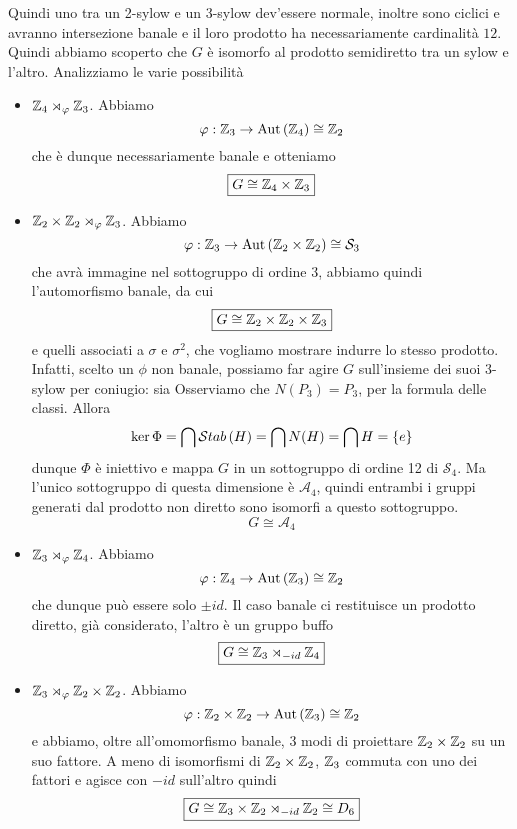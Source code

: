 \begin{multicols}{2}
Quindi uno tra un 2-sylow e un 3-sylow dev'essere normale, inoltre sono ciclici e avranno intersezione banale e il loro prodotto ha necessariamente cardinalità $ 12 $. Quindi abbiamo scoperto che $ G $ è isomorfo al prodotto semidiretto tra un sylow e l'altro. Analizziamo le varie possibilità

\begin{itemize}
	\item $ \mathbb{Z}_4 \rtimes_\varphi \mathbb{Z}_3 $. Abbiamo
	\[ \varphi : \mathbb{Z}_3 \to \mathrm{Aut}\left( \mathbb{Z}_4 \right) \cong \mathbb{Z}_2 \]
	che è dunque necessariamente banale e otteniamo
	\[ \boxed{G \cong \mathbb{Z}_4 \times \mathbb{Z}_3} \]
	\item $ \mathbb{Z}_2 \times \mathbb{Z}_2 \rtimes_\varphi \mathbb{Z}_3 $. Abbiamo
	\[ \varphi : \mathbb{Z}_3 \to \mathrm{Aut}\left( \mathbb{Z}_2\times\mathbb{Z}_2 \right) \cong \mathcal{S}_3 \]
	che avrà immagine nel sottogruppo di ordine $ 3 $, abbiamo quindi l'automorfismo banale, da cui
	\[  \boxed{G \cong \mathbb{Z}_2 \times \mathbb{Z}_2 \times \mathbb{Z}_3} \]
	e quelli associati a $ \sigma $ e $ \sigma^2 $, che vogliamo mostrare indurre lo stesso prodotto. Infatti, scelto un $ \phi $ non banale, possiamo far agire $ G $ sull'insieme dei suoi 3-sylow per coniugio: sia 
	Osserviamo che $ N(P_3) = P_3 $, per la formula delle classi. Allora $$  \ker\Phi = \bigcap \mathcal{S}tab\left( H \right) = \bigcap N(H) = \bigcap H = \{ e \}  $$ dunque $ \Phi $ è iniettivo e mappa $ G $ in un sottogruppo di ordine 12 di $ \mathcal{S}_4 $. Ma l'unico sottogruppo di questa dimensione è $ \mathcal{A}_4 $, quindi entrambi i gruppi generati dal prodotto non diretto sono isomorfi a questo sottogruppo.
	\[ \boxed{G \cong \mathcal{A}_4} \]
	\item $ \mathbb{Z}_3 \rtimes_\varphi \mathbb{Z}_4 $. Abbiamo
	\[ \varphi : \mathbb{Z}_4 \to \mathrm{Aut}\left( \mathbb{Z}_3 \right) \cong \mathbb{Z}_2 \]
	che dunque può essere solo $ \pm id $. Il caso banale ci restituisce un prodotto diretto, già considerato, l'altro è un gruppo buffo
	\[ \boxed{G \cong \mathbb{Z}_3 \rtimes_{-id} \mathbb{Z}_4} \]
	\item $ \mathbb{Z}_3 \rtimes_\varphi \mathbb{Z}_2 \times \mathbb{Z}_2  $. Abbiamo
	\[ \varphi : \mathbb{Z}_2 \times \mathbb{Z}_2  \to \mathrm{Aut}\left( \mathbb{Z}_3 \right) \cong \mathbb{Z}_2 \]
	e abbiamo, oltre all'omomorfismo banale, 3 modi di proiettare $ \mathbb{Z}_2 \times \mathbb{Z}_2  $ su un suo fattore. A meno di isomorfismi di $ \mathbb{Z}_2 \times \mathbb{Z}_2  $, $ \mathbb{Z}_3 $ commuta con uno dei fattori e agisce con $ -id $ sull'altro quindi
	\[ \boxed{G \cong \mathbb{Z}_3\times \mathbb{Z}_2 \rtimes_{-id} \mathbb{Z}_2 \cong D_6} \]
\end{itemize}




\end{multicols}

